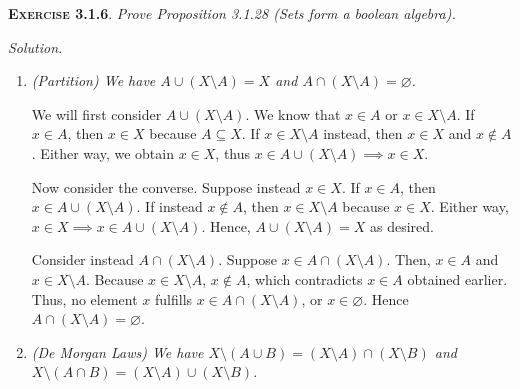 \documentclass[12pt]{article}
\theoremstyle{remark}
\newenvironment{exer}[2]{
    \noindent \setlength{\parskip}{1em}%
    \textsc{\textbf{Exercise #1}}. \textit{#2} \par
    \noindent \textit{Solution.} %
}{\bigskip}
\begin{document}
\begin{exer}{3.1.6}{
    Prove Proposition 3.1.28 (Sets form a boolean algebra).
}
\begin{enumerate}[topsep=0mm, label=(\alph*)]
            For the converse, suppose instead $x \in (A \cap B) \cup (A \cap C)$.
            Then, $x \in A \cap B$ or $x \in(A \cap C) $.
            If $x \in A \cap B$, then $x \in A$ and $x \in B$.
            Because $x \in B$, we know $x \in B \cup C$.
            Therefore, $x \in A \cap (B \cup C)$.
            In a similar fashion, if $x \in A \cap C$, we can conclude that $x \in A \cap (B \cup C)$.
            Hence, $A \cap (B \cup C) = (A \cap B) \cup (A \cap C)$ as required.

            We will now consider $A \cup (B \cap C) = (A \cup B) \cap (A \cup C)$.
            Suppose $x$ is an element of $A \cup (B \cap C)$.
            We know that $x \in A$ or $x \in (B \cap C)$.
            We will now split into two cases.
            If $x \in A$, then $x \in A \cup B$ and $x \in A \cup C$.
            If instead $x \in B \cap C$, then $x \in B$ and $x \in C$, so $x \in A \cup B$ and $x \in A \cup C$ as well.
            In both cases, we can conclude that $x \in (A \cup B) \cap (A \cup C)$.
        
        \item \textit{(Partition) We have $A \cup (X \setminus A) = X$ and $A \cap (X \setminus A) = \varnothing$.}

            We will first consider $A \cup (X \setminus A)$.
            We know that $x \in A$ or $x \in X \setminus A$.
            If $x \in A$, then $x \in X$ because $A \subseteq X$.
            If $x \in X \setminus A$ instead, then $x \in X$ and $x \notin A$.
            Either way, we obtain $x \in X$, thus $x \in A \cup (X \setminus A) \implies x \in X$.
            
            Now consider the converse.
            Suppose instead $x \in X$.
            If $x \in A$, then $x \in A \cup (X \setminus A)$.
            If instead $x \notin A$, then $x \in X \setminus A$ because $x \in X$.
            Either way, $x \in X \implies x \in A \cup (X \setminus A)$.
            Hence, $A \cup (X \setminus A) = X$ as desired.

            Consider instead $A \cap (X \setminus A)$.
            Suppose $x \in A \cap (X \setminus A)$.
            Then, $x \in A$ and $x \in X \setminus A$.
            Because $x \in X \setminus A$, $x \notin A$, which contradicts $x \in A$ obtained earlier.
            Thus, no element $x$ fulfills $x \in A \cap (X \setminus A)$, or $x \in \varnothing$.
            Hence $A \cap (X \setminus A) = \varnothing$.
        
        \item \textit{(De Morgan Laws) We have $X \setminus (A \cup B) = (X \setminus A) \cap (X \setminus B)$ and $X \setminus (A \cap B) = (X \setminus A) \cup (X \setminus B)$.}


\end{enumerate}
\end{exer}
\end{document}
